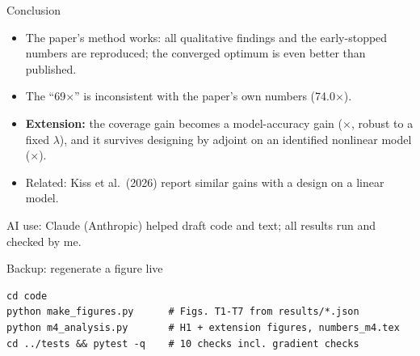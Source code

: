 \documentclass[aspectratio=169,10pt]{beamer}
\begin{document}
\begin{frame}{Conclusion}
\begin{itemize}
\item The paper's method works: all qualitative findings and the early-stopped numbers are reproduced;
the converged optimum is even better than published.
\item The ``69$\times$'' is inconsistent with the paper's own numbers (74.0$\times$).
\item \textbf{Extension:} the coverage gain becomes a model-accuracy gain (\mFOfullforty$\times$, robust to a fixed
$\lambda$), and it survives designing by adjoint on an identified nonlinear model (\mFOiterforty$\times$).
\item Related: Kiss et al.\ (2026) report similar gains with a design on a linear model.
\end{itemize}
{\footnotesize AI use: Claude (Anthropic) helped draft code and text; all results run and checked by me.}
\end{frame}

\appendix
\begin{frame}[fragile]{Backup: regenerate a figure live}
\begin{verbatim}
cd code
python make_figures.py      # Figs. T1-T7 from results/*.json
python m4_analysis.py       # H1 + extension figures, numbers_m4.tex
cd ../tests && pytest -q    # 10 checks incl. gradient checks
\end{verbatim}
\end{frame}
\end{document}
